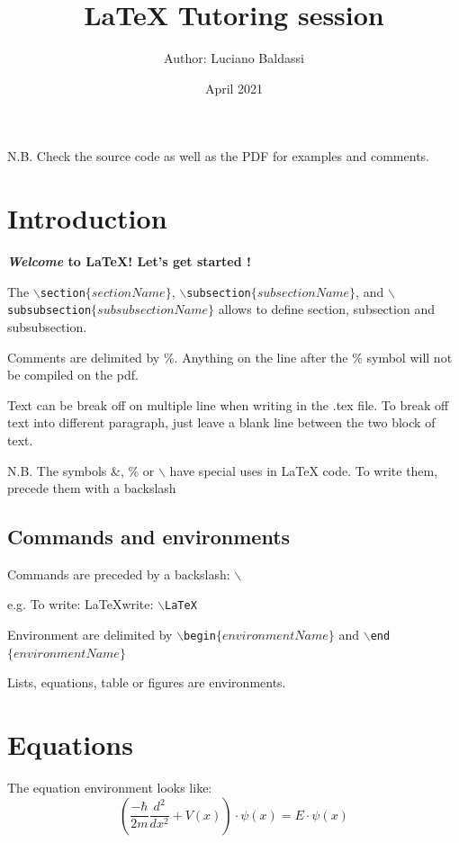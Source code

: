 \documentclass{article}
\title{\LaTeX{} Tutoring session}
\author{Author: Luciano Baldassi}
\date{April 2021}
\begin{document}
\maketitle

\tableofcontents


N.B. Check the source code as well as the PDF for examples and comments.
\section{Introduction}
\textbf{\textit{Welcome} to \LaTeX ! Let's get started !}


The \texttt{$\backslash$section$\{sectionName\}$}, \texttt{$\backslash$subsection$\{subsectionName\}$}, and \texttt{$\backslash$subsubsection$\{subsubsectionName\}$} allows to define section, subsection and subsubsection.


Comments are delimited by \%. Anything on the line after the \% symbol will not be compiled on the pdf.

Text can be break off on multiple line when writing in the .tex file. To break off text into different paragraph, just leave a blank line between the two block of text.


N.B. The symbols \&, \% or $\backslash$ have special uses in \LaTeX{} code. To write them, precede them with a backslash


\subsection{Commands and environments}
Commands are preceded by a backslash: $\backslash$

e.g. To write: \LaTeX write: %
$\backslash$\texttt{LaTeX}

Environment are delimited by \texttt{$\backslash$begin$\{environmentName\}$} and \texttt{$\backslash$end$\{environmentName\}$}

Lists, equations, table or figures are environments.

\section{Equations}

The equation environment looks like:
\begin{equation}
    \left( \frac{-\hbar}{2m} \frac{d^2}{dx^2} + V(x) \right) \cdot \psi(x) = E \cdot \psi(x)
    \label{eq:Schrodinger}
\end{equation}
\end{document}
